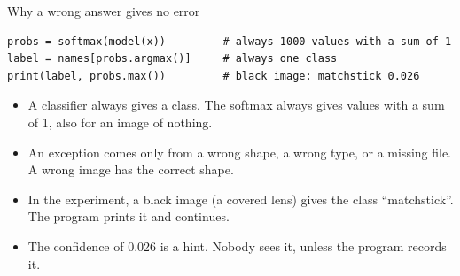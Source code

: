 \begin{frame}[fragile]{Why a wrong answer gives no error}
\begin{lstlisting}[style=python]
probs = softmax(model(x))         # always 1000 values with a sum of 1
label = names[probs.argmax()]     # always one class
print(label, probs.max())         # black image: matchstick 0.026
\end{lstlisting}
  \small
  \begin{itemize}
    \item A classifier always gives a class. The softmax always gives
          values with a sum of 1, also for an image of nothing.
    \item An exception comes only from a wrong shape, a wrong type, or a
          missing file. A wrong image has the correct shape.
    \item In the experiment, a black image (a covered lens) gives the class
          ``matchstick''. The program prints it and continues.
    \item The confidence of 0.026 is a hint. Nobody sees it, unless the
          program records it.
  \end{itemize}
\end{frame}

